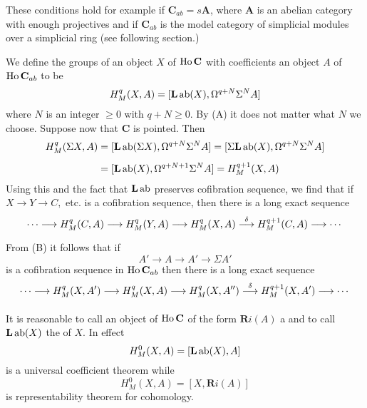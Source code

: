 \documentclass[../main]{subfiles}
\begin{document}
These conditions hold for example if  $\mathbf C_{ab} = s \mathbf A$, where $\mathbf A$ is an abelian category with enough projectives and if $\mathbf C_{ab}$ is the model category of simplicial modules over a simplicial ring (see following section.)

We define the  groups of an object $X$ of $\operatorname{Ho} \mathbf C$ with coefficients an object $A$ of $\operatorname{Ho} \mathbf C_{ab}$ to be 
\[ 
  H_{M}^q(X,A) = [\mathbf L \operatorname{ab} (X), \Omega^{q+N}\Sigma^NA ]
\] 
where $N$ is an integer $\ge 0$ with $q+N\ge 0$. By (A) it does not matter what $N$ we choose. Suppose now that $\mathbf C$ is pointed. Then 
\begin{align*}
  H_{M}^{q} (\Sigma X, A) &= [\mathbf{L}\operatorname{ab}  (\Sigma X), \Omega^{q+N}\Sigma^NA] = [\Sigma \mathbf{L}\operatorname{ab} (X), \Omega^{q+N}\Sigma^N A]\\[0.5em]
                          &= [\mathbf{L}\operatorname{ab} (X), \Omega^{q+N+1}\Sigma^N A] = H_{M}^{q+1} (X,A)
\end{align*}
Using this and the fact that $\mathbf{L}\operatorname{ab} $ preserves cofibration sequence, we find that if $X \longrightarrow  Y \longrightarrow  C,$ etc. is a cofibration sequence, then there is a long exact sequence
\[ 
  \cdots \longrightarrow  H_{M}^{q} (C,A) \longrightarrow  H_{M}^{q} (Y,A) \longrightarrow  H_{M}^{q}(X,A) \varrightarrow{\delta } H_{M}^{q+1} (C,A) \longrightarrow   \cdots
\] 
From (B) it follows that if \[A'\longrightarrow A\longrightarrow A' \longrightarrow \Sigma A'\]
is a cofibration sequence in $\operatorname{Ho} \mathbf{C}_{ab}$ then there is a long exact sequence
\[\cdots\longrightarrow  H_{M}^{q} (X,A') \longrightarrow  H_{M}^{q} (X,A) \longrightarrow  H_{M}^{q}(X,A'') \varrightarrow{\delta } H_{M}^{q+1} (X,A') \longrightarrow\cdots \]

It is reasonable to call an object of $\operatorname{Ho} \mathbf{C}$ of the form $\mathbf{R} i(A)$ a  and to call $\mathbf{L}\operatorname{ab} (X)$ the  of $X$. In effect
\[ 
  H_{M}^{0}(X,A) = [\mathbf{L}\operatorname{ab} (X),A]
\] 
is a universal coefficient theorem while 
\[ 
  H_{M}^{0} (X,A) = [X, \mathbf{R} i(A)]
\] 
is representability theorem for cohomology.
\end{document}
